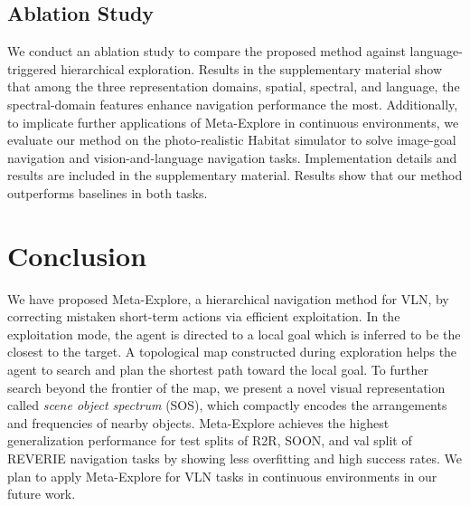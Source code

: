 \documentclass[10pt,twocolumn,letterpaper]{article}
\begin{document}
\subsection{Ablation Study}
\vspace{-0.2cm}
We conduct an ablation study to compare the proposed method against language-triggered hierarchical exploration. Results in the supplementary material show that among the three representation domains, spatial, spectral, and language, the spectral-domain features enhance navigation performance the most. Additionally, to implicate further applications of Meta-Explore in continuous environments, we evaluate our method on the photo-realistic Habitat \cite{szot2021habitat} simulator to solve image-goal navigation and vision-and-language navigation tasks. Implementation details and results are included in the supplementary material. Results show that our method outperforms baselines in both tasks.
\vspace{-0.2cm}

\section{Conclusion}
\vspace{-0.2cm}
We have proposed Meta-Explore, a hierarchical navigation method for VLN, by correcting mistaken short-term actions via efficient exploitation. In the exploitation mode, the agent is directed to a local goal which is inferred to be the closest to the target. A topological map constructed during exploration helps the agent to search and plan the shortest path toward the local goal. To further search beyond the frontier of the map, we present a novel visual representation called \textit{scene object spectrum} (SOS), which compactly encodes the arrangements and frequencies of nearby objects. Meta-Explore achieves the highest generalization performance for test splits of R2R, SOON, and val split of REVERIE navigation tasks by showing less overfitting and high success rates. We plan to apply Meta-Explore for VLN tasks in continuous environments in our future work.


{\small


}
\clearpage

\appendix
{}
\end{document}
